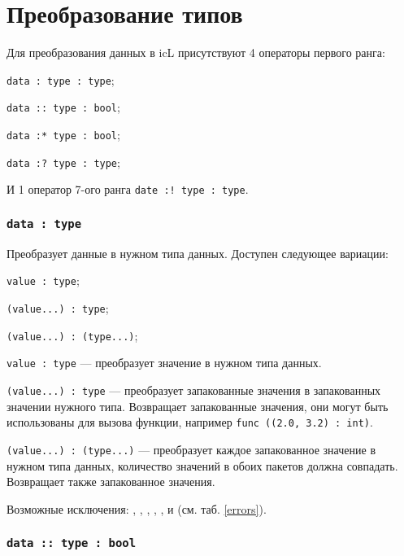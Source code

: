 \section{Преобразование типов}

Для преобразования данных в icL присутствуют 4 операторы первого ранга:
\begin{icItems}
	\item \texttt{data : type : type};
	\item \texttt{data :: type : bool};
	\item \texttt{data :* type : bool};
	\item \texttt{data :? type : type};
\end{icItems}

И 1 оператор 7-ого ранга \texttt{date :! type : type}.

\subsubsection{\texttt{data : type}}

Преобразует данные в нужном типа данных. Доступен следующее вариации:
\begin{icItems}
	\item \texttt{value : type};
	\item \texttt{(value...) : type};
	\item \texttt{(value...) : (type...)};
\end{icItems}

\texttt{value : type} — преобразует значение в нужном типа данных.

\texttt{(value...) : type} — преобразует запакованные значения в запакованных значении нужного типа. Возвращает запакованные значения, они могут быть использованы для вызова функции, например \texttt{func ((2.0, 3.2) : int)}.

\texttt{(value...) : (type...)} — преобразует каждое запакованное значение в нужном типа данных, количество значений в обоих пакетов должна совпадать. Возвращает также запакованное значения.

Возможные исключения: , , , , ,  и  (см. таб. \ref{errors}).

\subsubsection{\texttt{data :: type : bool}}

